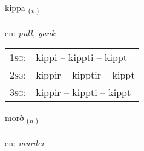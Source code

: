 \documentclass[frontgrid, backgrid]{flacards}\usepackage[]{graphicx}\usepackage[]{xcolor}
\begin{document}
\renewcommand{\flhead}{\vskip5pt \fboxsep=0pt {\small\bfseries\footnotesize Sagnorð | Verb}}
\renewcommand{\fcfoot}{\vskip5pt \fboxsep=0pt \hspace{2pt}{\small\bfseries\footnotesize 3K}}

\renewcommand{\blhead}{\vskip5pt {\small\bfseries\footnotesize Sagnorð | Verb }}
\renewcommand{\bcfoot}{\vskip5pt \hspace{2pt}{\small\bfseries\footnotesize 3K}}


{kippa \small{\textsubscript{(\textit{v.})}} \\[1ex] %
\textphonetic{[cʰɪhpa]} \\
en: \emph{pull, yank} \\  [2ex]
\renewcommand*{\arraystretch}{0.8}
\begin{tabular}{p{1cm}l}
\textsc{1sg}: & kippi -- kippti -- kippt \\ 
\textsc{2sg}: & kippir -- kipptir -- kippt \\ 
\textsc{3sg}: & kippir -- kippti -- kippt \\ 
\end{tabular}
}

\renewcommand{\flhead}{\vskip5pt \fboxsep=0pt {\small\bfseries\footnotesize Nafnorð | Noun}}
\renewcommand{\fcfoot}{\vskip5pt \fboxsep=0pt \hspace{2pt}{\small\bfseries\footnotesize 3K}}

\renewcommand{\blhead}{\vskip5pt {\small\bfseries\footnotesize Nafnorð | Noun }}
\renewcommand{\bcfoot}{\vskip5pt \hspace{2pt}{\small\bfseries\footnotesize 3K}}


{morð \small{\textsubscript{(\textit{n.})}} \\[1ex] %
\textphonetic{[mɔrð]} \\
en: \emph{murder} \\  [2ex]
\renewcommand*{\arraystretch}{0.8}
}
\end{document}
